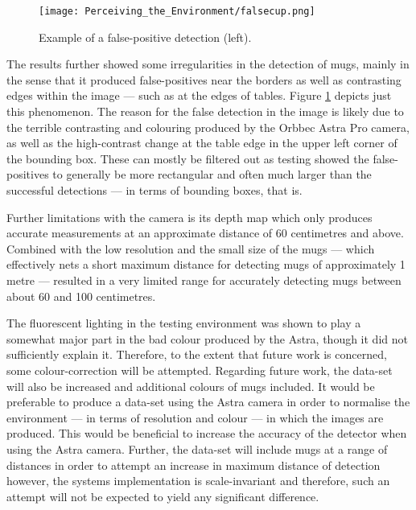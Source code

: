\begin{figure}[h!]
    \centering
    \texttt{[image: Perceiving\_the\_Environment/falsecup.png]}
    \caption{Example of a false-positive detection (left).}
    \label{fig:od_falsepositive}
\end{figure}

The results further showed some irregularities in the detection of mugs, mainly in the sense that it produced false-positives near the borders as well as contrasting edges within the image --- such as at the edges of tables.
Figure \ref{fig:od_falsepositive} depicts just this phenomenon. The reason for the false detection in the image is likely due to the terrible contrasting and colouring produced by the Orbbec Astra Pro camera, as well as the high-contrast change at the table edge in the upper left corner of the bounding box. These can mostly be filtered out as testing showed the false-positives to generally be more rectangular and often much larger than the successful detections --- in terms of bounding boxes, that is.

Further limitations with the camera is its depth map which only produces accurate measurements at an approximate distance of 60 centimetres and above. Combined with the low resolution and the small size of the mugs --- which effectively nets a short maximum distance for detecting mugs of approximately 1 metre --- resulted in a very limited range for accurately detecting mugs between about 60 and 100 centimetres.

The fluorescent lighting in the testing environment was shown to play a somewhat major part in the bad colour produced by the Astra, though it did not sufficiently explain it. Therefore, to the extent that future work is concerned, some colour-correction will be attempted. Regarding future work, the data-set will also be increased and additional colours of mugs included. It would be preferable to produce a data-set using the Astra camera in order to normalise the environment --- in terms of resolution and colour --- in which the images are produced. This would be beneficial to increase the accuracy of the detector when using the Astra camera. Further, the data-set will include mugs at a range of distances in order to attempt an increase in maximum distance of detection however, the systems implementation is scale-invariant and therefore, such an attempt will not be expected to yield any significant difference. 


